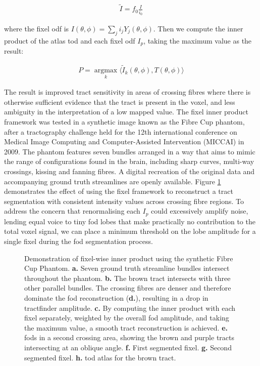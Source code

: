 \begin{align}
  \widetilde{I} = f_0\frac{I}{i_0}
\end{align}

where the fixel \gls{odf} is $I(\theta, \phi) = \sum_j i_j Y_j(\theta,\phi)$.
Then we compute the inner product of the atlas \gls{tod} and each fixel \gls{odf} $I_p$, taking the maximum value as the result:

\begin{align}
  P = \operatorname*{argmax}_k \langle \widetilde{I}_k(\theta,\phi), T(\theta,\phi) \rangle
\end{align}

The result is improved tract sensitivity in areas of crossing fibres where there is otherwise sufficient evidence that the tract is present in the voxel, and less ambiguity in the interpretation of a low mapped value.
The fixel inner product framework was tested in a synthetic image known as the Fibre Cup phantom, after a tractography challenge held for the 12th international conference on Medical Image Computing and Computer-Assisted Intervention (MICCAI) in 2009\autocite{Fillard2011}.
The phantom features seven bundles arranged in a way that aims to mimic the range of configurations found in the brain, including sharp curves, multi-way crossings, kissing and fanning fibres.
A digital recreation of the original data and accompanying ground truth streamlines are openly available\autocite{NITRC}.
Figure \ref{fig:fixip} demonstrates the effect of using the fixel framework to reconstruct a tract segmentation with consistent intensity values across crossing fibre regions.
To address the concern that renormalising each $I_p$ could excessively amplify noise, lending equal voice to tiny \gls{fod} lobes that make practically no contribution to the total voxel signal, we can place a minimum threshold on the lobe amplitude for a single fixel during the \gls{fod} segmentation process.

\begin{figure}[tbh!]
  \centering
  
  \caption{Demonstration of fixel-wise inner product using the synthetic Fibre Cup Phantom. \textbf{a.} Seven ground truth streamline bundles intersect throughout the phantom. \textbf{b.} The brown tract intersects with three other parallel bundles. The crossing fibres are denser and therefore dominate the \gls{fod} reconstruction (\textbf{d.}), resulting in a drop in tractfinder amplitude. \textbf{c.} By computing the inner product with each fixel separately, weighted by the overall \gls{fod} amplitude, and taking the maximum value, a smooth tract reconstruction is achieved. \textbf{e.} \glspl{fod} in a second crossing area, showing the brown and purple tracts intersecting at an oblique angle. \textbf{f.} First segmented fixel. \textbf{g.} Second segmented fixel. \textbf{h.} \Gls{tod} atlas for the brown tract.}\label{fig:fixip}
\end{figure}
